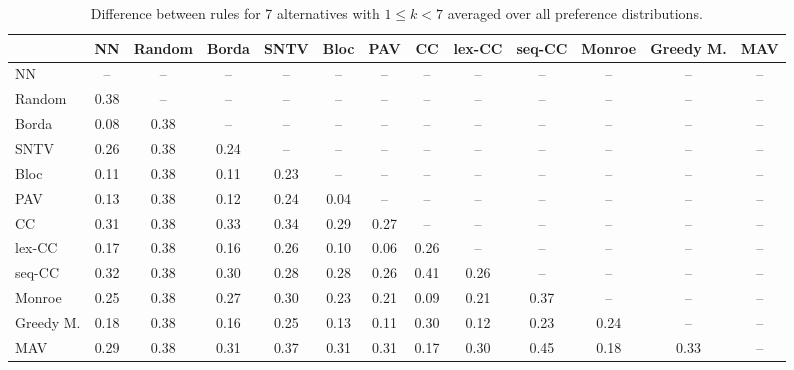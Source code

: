 
\begin{table*}[h!]
\centering
\begin{tabular}{lcccccccccccc}
\toprule
 & NN & Random & Borda & SNTV & Bloc & PAV & CC & lex-CC & seq-CC & Monroe & Greedy M. & MAV \\
\midrule
NN & -- & -- & -- & -- & -- & -- & -- & -- & -- & -- & -- & -- \\
Random & 0.38 & -- & -- & -- & -- & -- & -- & -- & -- & -- & -- & -- \\
Borda & 0.08 & 0.38 & -- & -- & -- & -- & -- & -- & -- & -- & -- & -- \\
SNTV & 0.26 & 0.38 & 0.24 & -- & -- & -- & -- & -- & -- & -- & -- & -- \\
Bloc & 0.11 & 0.38 & 0.11 & 0.23 & -- & -- & -- & -- & -- & -- & -- & -- \\
PAV & 0.13 & 0.38 & 0.12 & 0.24 & 0.04 & -- & -- & -- & -- & -- & -- & -- \\
CC & 0.31 & 0.38 & 0.33 & 0.34 & 0.29 & 0.27 & -- & -- & -- & -- & -- & -- \\
lex-CC & 0.17 & 0.38 & 0.16 & 0.26 & 0.10 & 0.06 & 0.26 & -- & -- & -- & -- & -- \\
seq-CC & 0.32 & 0.38 & 0.30 & 0.28 & 0.28 & 0.26 & 0.41 & 0.26 & -- & -- & -- & -- \\
Monroe & 0.25 & 0.38 & 0.27 & 0.30 & 0.23 & 0.21 & 0.09 & 0.21 & 0.37 & -- & -- & -- \\
Greedy M. & 0.18 & 0.38 & 0.16 & 0.25 & 0.13 & 0.11 & 0.30 & 0.12 & 0.23 & 0.24 & -- & -- \\
MAV & 0.29 & 0.38 & 0.31 & 0.37 & 0.31 & 0.31 & 0.17 & 0.30 & 0.45 & 0.18 & 0.33 & -- \\
\bottomrule
\end{tabular}

\caption{Difference between rules for 7 alternatives with $1 \leq k < 7$ averaged over all preference distributions.}
\end{table*}
